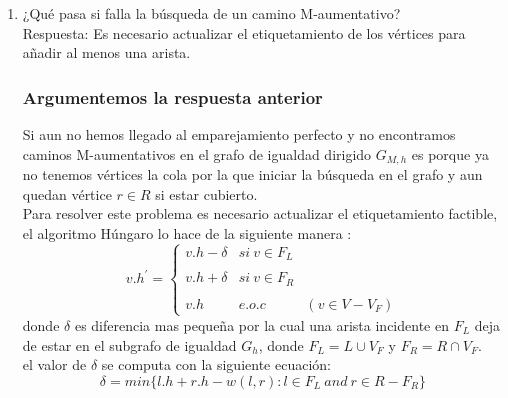 \documentclass[sn-mathphys,Numbered]{sn-jnl}%
\theoremstyle{thmstyleone}%
\theoremstyle{thmstyletwo}%
\theoremstyle{thmstylethree}%
\begin{document}
\begin{enumerate}
    Note que: Un camino M-aumentativo en $G_{M,h}$ es también un camino M-aumentativo en $G_h$.Probemos esto \\
    Sea $C = \{ v_1,v_2,...,v_n\}$ un camino M-aumentativo en $M_{M,h}$\\
    $\forral$ arista dirigida $(v,u)\in M_{M,h}$ existe la arista (v,u) no dirigida en $M_h$ por como se construyen las aristas de $M_{M,h}$ (2)\\
    Luego $\forral  e \in C$ se puede construir un camino $C^{'}$ en $M_h$ tal que $e \in C^{'}$
    Luego $C^{'}$ nos brinda un cubrimiento que cubre al menos dos vértices mas que el emparejamiento M inicial en $M_h$. Por tanto $C^{'}$ es un camino M-aumentativo en $M_h$.\\
    Además al tener C y $C^{'}$ las mismas aristas entonces C y $C^{'}$ son iguales.\\
    \item ¿Qu\'e pasa si falla la búsqueda de un camino M-aumentativo?\\
    Respuesta: Es necesario actualizar el etiquetamiento de los vértices para a\~nadir al menos una arista.\\
    \subsubsection*{Argumentemos la respuesta anterior}
    Si aun no hemos llegado al emparejamiento perfecto y no encontramos caminos M-aumentativos en el grafo de igualdad dirigido $G_{M,h}$ es porque ya no tenemos vértices la cola por la que iniciar la búsqueda en el grafo y aun quedan vértice $r\in R$ si estar cubierto.\\
    Para resolver este problema es necesario actualizar el etiquetamiento factible, el algoritmo Húngaro lo hace de la siguiente manera :
    \begin{equation}
        v.h^{'} = \left\{\begin{array}{lcc}
                    v.h - \delta & si  ~v \in F_L \\
                    \\v.h + \delta & si ~v \in F_R \\
                    \\v.h & e.o.c & (v\in V - V_F)
                    
                    \end{array}
        \right.
    \end{equation}
    donde $\delta$ es diferencia mas peque\~na por la cual una arista incidente en $F_L$ deja de estar en el subgrafo de igualdad $G_h$, donde $F_L = L \cup V_F$ y $F_{R} = R \cap V_F$.\\
    el valor de $\delta$ se computa con la siguiente ecuación:\\
    \begin{equation}
        \delta = min \{l.h + r.h - w(l,r) : l \in F_L~and~ r\in R - F_R \}
    \end{equation}  
    

\end{enumerate}
\end{document}
